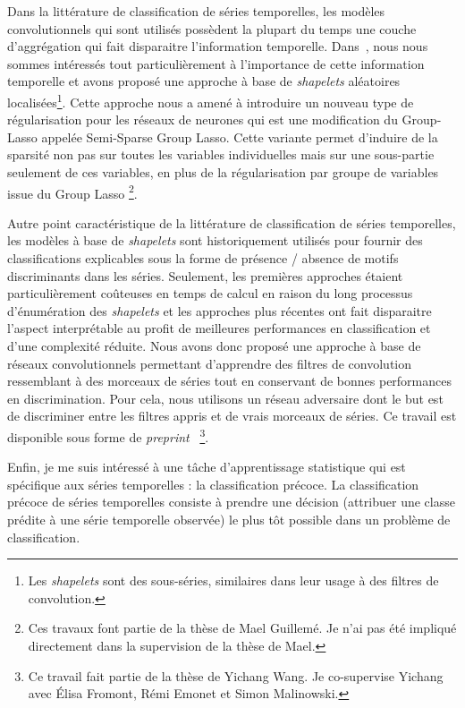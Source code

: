 Dans la littérature de classification de séries temporelles, les modèles
convolutionnels qui sont utilisés possèdent la plupart du temps une couche
d'aggrégation qui fait disparaitre l'information temporelle.
Dans~\cite{guilleme:hal-02513295}, nous nous sommes intéressés tout
particulièrement à l'importance de cette information temporelle et avons
proposé une approche à base de \emph{shapelets}
aléatoires localisées\footnote{Les \emph{shapelets} sont des sous-séries,
similaires dans leur usage à des filtres de convolution.}.
Cette approche nous a amené à introduire un nouveau type de régularisation pour
les réseaux de neurones qui est une modification du Group-Lasso appelée
Semi-Sparse Group Lasso.
Cette variante permet d'induire de la sparsité non pas sur toutes les variables
individuelles mais sur une sous-partie seulement de ces variables,
en plus de la régularisation
par groupe de variables issue du Group Lasso%
\footnote{Ces travaux font partie de la thèse de Mael Guillemé.
Je n'ai pas été impliqué directement dans la supervision de la thèse de Mael.}.

Autre point caractéristique de la littérature de classification de séries
temporelles, les modèles à base de \emph{shapelets} sont historiquement utilisés
pour fournir des classifications explicables sous la forme de présence / absence
de motifs discriminants dans les séries.
Seulement, les premières approches étaient particulièrement coûteuses en temps
de calcul en raison du long processus d'énumération des \emph{shapelets} et les
approches plus récentes ont fait disparaitre l'aspect interprétable au profit
de meilleures performances en classification et d'une complexité réduite.
Nous avons donc proposé une approche à base de réseaux convolutionnels
permettant d'apprendre des filtres de convolution ressemblant à des morceaux
de séries tout en conservant de bonnes performances en discrimination.
Pour cela, nous utilisons un réseau adversaire dont le but est de discriminer
entre les filtres appris et de vrais morceaux de séries.
Ce travail est disponible sous forme de \emph{preprint}~\cite{wang2019}%
\footnote{Ce travail fait partie de la thèse de Yichang Wang.
Je co-supervise Yichang avec Élisa Fromont, Rémi Emonet et Simon
Malinowski.}.

\haveabreak{}

Enfin, je me suis intéressé à une tâche d'apprentissage statistique qui est
spécifique aux séries temporelles : la classification précoce.
La classification précoce de séries temporelles consiste à prendre une décision
(attribuer une classe prédite à une série temporelle observée) le plus tôt
possible dans un problème de classification.

